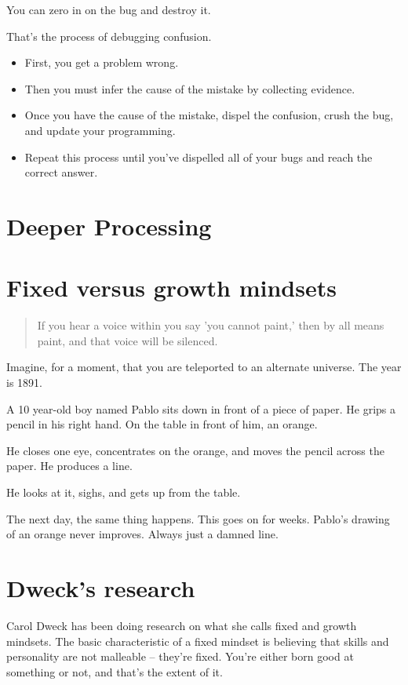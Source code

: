 You can zero in on the bug and destroy it.

That's the process of debugging confusion.

\begin{itemize}
\item First, you get a problem wrong.
\item Then you must infer the cause of the mistake by collecting evidence.
\item Once you have the cause of the mistake, dispel the confusion, crush the bug,
  and update your programming.
\item Repeat this process until you've dispelled all of your bugs and reach the
  correct answer.
\end{itemize}

\section{Deeper Processing}

\section{Fixed versus growth mindsets}

\begin{quote}
  If you hear a voice within you say 'you cannot paint,' then by all means
  paint, and that voice will be silenced.
\end{quote}

Imagine, for a moment, that you are teleported to an alternate universe. The
year is 1891.

A 10 year-old boy named Pablo sits down in front of a piece of paper. He grips a
pencil in his right hand. On the table in front of him, an orange.

He closes one eye, concentrates on the orange, and moves the pencil across the
paper. He produces a line.

He looks at it, sighs, and gets up from the table.

The next day, the same thing happens. This goes on for weeks. Pablo's drawing of
an orange never improves. Always just a damned line.

\section{Dweck's research}

Carol Dweck has been doing research on what she calls fixed and growth
mindsets. The basic characteristic of a fixed mindset is believing that skills
and personality are not malleable -- they're fixed. You're either born good at
something or not, and that's the extent of it.

